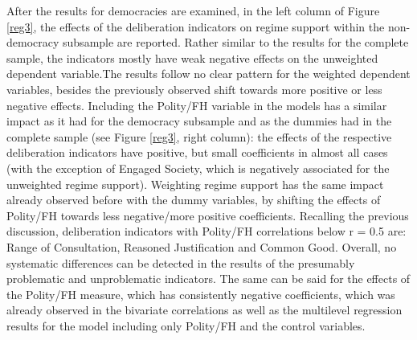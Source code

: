 \documentclass[]{article}
\begin{document}
After the results for democracies are examined, in the left column of
Figure \ref{reg3}, the effects of the deliberation indicators on regime
support within the non-democracy subsample are reported. Rather similar
to the results for the complete sample, the indicators mostly have weak
negative effects on the unweighted dependent variable.The results follow
no clear pattern for the weighted dependent variables, besides the
previously observed shift towards more positive or less negative
effects. Including the Polity/FH variable in the models has a similar
impact as it had for the democracy subsample and as the dummies had in
the complete sample (see Figure \ref{reg3}, right column): the effects
of the respective deliberation indicators have positive, but small
coefficients in almost all cases (with the exception of Engaged Society,
which is negatively associated for the unweighted regime support).
Weighting regime support has the same impact already observed before
with the dummy variables, by shifting the effects of Polity/FH towards
less negative/more positive coefficients. Recalling the previous
discussion, deliberation indicators with Polity/FH correlations below r
= 0.5 are: Range of Consultation, Reasoned Justification and Common
Good. Overall, no systematic differences can be detected in the results
of the presumably problematic and unproblematic indicators. The same can
be said for the effects of the Polity/FH measure, which has consistently
negative coefficients, which was already observed in the bivariate
correlations as well as the multilevel regression results for the model
including only Polity/FH and the control variables.
\end{document}
